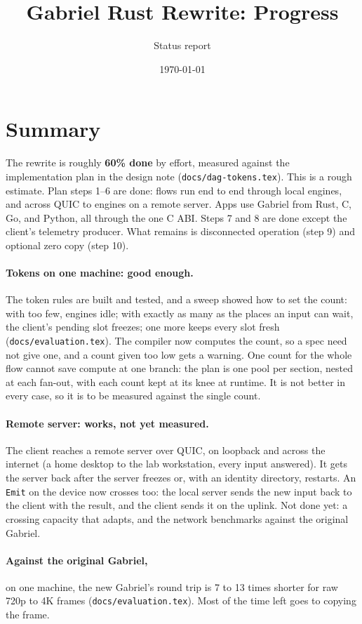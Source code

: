 \documentclass[11pt]{article}
\title{Gabriel Rust Rewrite: Progress}
\author{Status report}
\date{\today}
\newcommand{\code}[1]{\texttt{#1}}
\begin{document}
\maketitle

\section{Summary}

The rewrite is roughly \textbf{60\% done} by effort, measured against the
implementation plan in the design note (\code{docs/dag-tokens.tex}). This is a
rough estimate. Plan steps 1--6 are done: flows run end to end through local
engines, and across QUIC to engines on a remote server. Apps use Gabriel from
Rust, C, Go, and Python, all through the one C ABI. Steps 7 and 8 are done
except the client's telemetry producer. What remains is disconnected
operation (step 9) and optional zero copy (step 10).

\paragraph{Tokens on one machine: good enough.} The token rules are built and
tested, and a sweep showed how to set the count: with too few, engines idle;
with exactly as many as the places an input can wait, the client's pending
slot freezes; one more keeps every slot fresh (\code{docs/evaluation.tex}).
The compiler now computes the count, so a spec need not give one, and a
count given too low gets a warning. One count for the whole
flow cannot save compute at one branch: the plan is one pool per section,
nested at each fan-out, with each count kept at its knee at runtime. It is
not better in every case, so it is to be measured against the single count.

\paragraph{Remote server: works, not yet measured.} The client reaches a
remote server over QUIC, on loopback and across the internet (a home desktop
to the lab workstation, every input answered). It gets the server back after
the server freezes or, with an identity directory, restarts. An
\code{Emit} on the device now crosses too: the local server sends the new
input back to the client with the result, and the client sends it on the
uplink. Not done yet: a crossing capacity that adapts, and the network benchmarks against the original Gabriel.

\paragraph{Against the original Gabriel,} on one machine, the new Gabriel's
round trip is 7 to 13 times shorter for raw 720p to 4K frames
(\code{docs/evaluation.tex}). Most of the time left goes to copying the frame.
\end{document}
